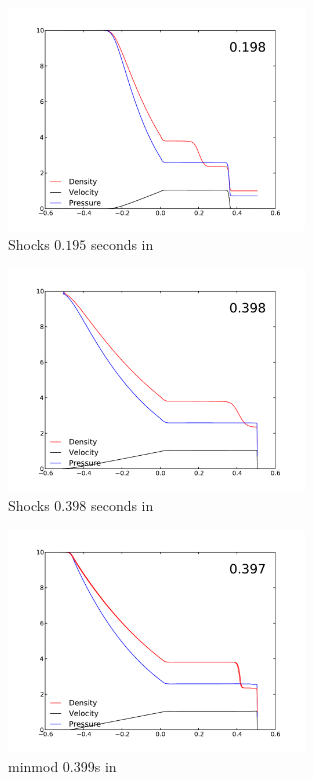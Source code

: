 \documentclass[11pt,letterpaper]{article}
\begin{document}
\begin{figure}[bth]
\centering
\includegraphics[width=0.7\textwidth]{t500.pdf}
\caption{Shocks $0.195$ seconds in}
\label{fig:3}
\end{figure}

\begin{figure}[bth]
\centering
\includegraphics[width=0.7\textwidth]{t950.pdf}
\caption{Shocks $0.398$ seconds in}
\label{fig:4}
\end{figure}

\begin{figure}[bth]
\centering
\includegraphics[width=0.7\textwidth]{minmod.pdf}
\caption{minmod 0.399s in}
\label{fig:5}
\end{figure}
\end{document}
